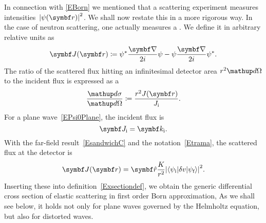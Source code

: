 In connection with \cref{EBorn} we mentioned
that a scattering experiment measures intensities~${|\psi(\r)|}^2$.
We shall now restate this in a more rigorous way.
In the case of neutron scattering,
one actually measures a .
We define it in arbitrary relative units as
\begin{equation}\label{EdefJ}
  \v{J}(\r) \coloneqq  \psi^*\frac{\Nabla}{2i}\psi - \psi\frac{\Nabla}{2i}\psi^*.
\end{equation}
%
%
The ratio of the scattered flux hitting an infinitesimal detector area
$r^2\d\Omega$ to the incident flux is expressed as a
%
%
\begin{equation}\label{Exsectiondef}
  \frac{\d\sigma}{\d\Omega}
  \coloneqq  \frac{r^2 J(\r)}{J_\ti}.
\end{equation}
%
%
For a plane wave~\cref{EPsi0Plane}, the incident flux is
%
%
\begin{equation}\label{EJi}
  \v{J}_\ti = \k_\ti.
\end{equation}
With the far-field result~\cref{EsandwichC}
and the notation~\cref{Etrama},
the scattered flux at the detector is
\begin{equation}\label{EJr}
  \v{J}(\r)
  = \v{\hat r}\frac{K}{r^2}
    {\left|\bra\psi_\ti|\delta v|\psi_\tf\ket\right|}^2.
\end{equation}
Inserting these into definition~\cref{Exsectiondef},
we obtain the generic differential cross section
of elastic scattering in first order Born approximation,
%
%
%
%
As we shall see below,
it holds not only for plane waves governed
by the Helmholtz equation,
but also for distorted waves.
%

